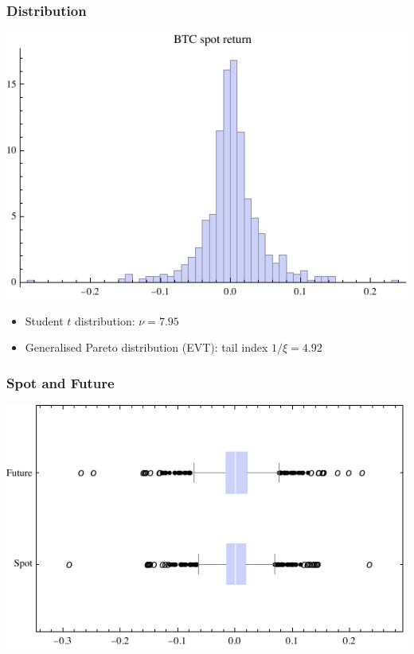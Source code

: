 \documentclass[10pt,mathserif]{beamer}
\renewcommand{\(}{\begin{columns}}
\renewcommand{\)}{\end{columns}}
\newcommand{\<}[1]{\begin{column}{#1}}
\renewcommand{\>}{\end{column}}
\theoremstyle{definition}
\begin{document}


\begin{frame}
  \frametitle{Distribution}
  \begin{center}
    \includegraphics[scale=1]{../_pics/btc_hist.pdf}
  \end{center}
  \begin{itemize}
  \item Student $t$ distribution: $\nu=7.95$
  \item Generalised Pareto distribution (EVT): tail index $1/\xi=4.92$ 
  \end{itemize}
\end{frame}


\begin{frame}
  \frametitle{Spot and Future}
  \begin{center}
    \includegraphics[scale=1]{../_pics/btc_future_box.pdf}
  \end{center}
\end{frame}
\end{document}
